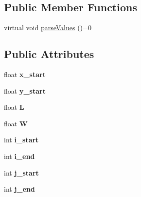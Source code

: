 \subsection*{Public Member Functions}
\begin{DoxyCompactItemize}
\item 
virtual void \hyperlink{classNonPolyBuilding_ace133756e0233d75b434fec5273b4414}{parse\+Values} ()=0
\end{DoxyCompactItemize}
\subsection*{Public Attributes}
\begin{DoxyCompactItemize}
\item 
\mbox{\label{classNonPolyBuilding_a8336ab0b519db15cc53564ab1f4f17d4}} 
float {\bfseries x\+\_\+start}
\item 
\mbox{\label{classNonPolyBuilding_a49a1c9d392aab2fb3168a31adc3633f1}} 
float {\bfseries y\+\_\+start}
\item 
\mbox{\label{classNonPolyBuilding_a38a5d61b85eecc81389a401e7bd5377f}} 
float {\bfseries L}
\item 
\mbox{\label{classNonPolyBuilding_ab66753a47f7298de752f42d7ea84f393}} 
float {\bfseries W}
\item 
\mbox{\label{classNonPolyBuilding_a96c7173898b586ec5e624999ffb967cd}} 
int {\bfseries i\+\_\+start}
\item 
\mbox{\label{classNonPolyBuilding_ab0c41ec9b31a43dbad67f12b5bae530d}} 
int {\bfseries i\+\_\+end}
\item 
\mbox{\label{classNonPolyBuilding_a0320d925ddd784f039265c5726802213}} 
int {\bfseries j\+\_\+start}
\item 
\mbox{\label{classNonPolyBuilding_a989c0757ee74e749dedaf17a8b5f4375}} 
int {\bfseries j\+\_\+end}
\item 
\mbox{\label{classNonPolyBuilding_ac09986f076f8285e3307b8dd07202d48}} 

\end{DoxyCompactItemize}

